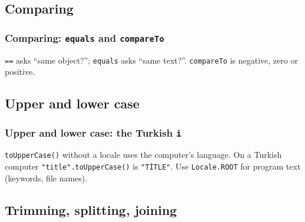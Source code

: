 \documentclass[aspectratio=169,10pt,compress]{beamer}
\begin{document}
\subsection[Compare]{Comparing}




\begin{frame}[t,fragile] \frametitle{Comparing: \texttt{equals} and \texttt{compareTo}}

  \vspace{0.3em}
  \small \texttt{==} asks ``same object?''; \texttt{equals} asks ``same text?''. \texttt{compareTo} is negative, zero or positive.
\end{frame}

\subsection[Case]{Upper and lower case}




\begin{frame}[t,fragile] \frametitle{Upper and lower case: the Turkish \texttt{i}}

  \vspace{0.3em}
  \small {} \texttt{toUpperCase()} without a locale uses the computer's language. On a Turkish
  computer \texttt{"title".toUpperCase()} is \texttt{"TİTLE"}. Use \texttt{Locale.ROOT} for program text (keywords, file names).
\end{frame}


\subsection[Split]{Trimming, splitting, joining}
\end{document}
